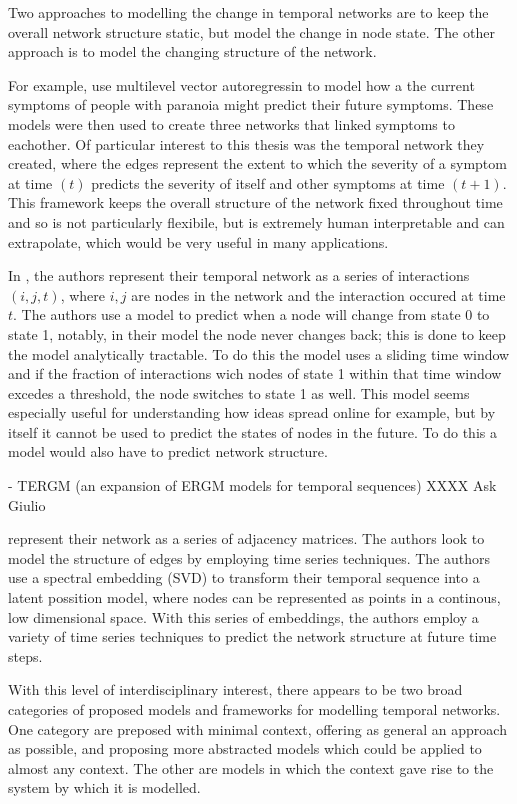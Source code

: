 \documentclass[12pt]{amsart}
\begin{document}
    
    Two approaches to modelling the change in temporal networks are to keep the overall network structure static, but model the change in node state. The other approach is to model the changing structure of the network. 

    For example, \cite{contreras2020temporal} use multilevel vector autoregressin to model how a the current symptoms of people with paranoia might predict their future symptoms. These models were then used to create three networks that linked symptoms to eachother. Of particular interest to this thesis was the temporal network they created, where the edges represent the extent to which the severity of a symptom at time $(t)$ predicts the severity of itself and other symptoms at time $(t+1)$. This framework keeps the overall structure of the network fixed throughout time and so is not particularly flexibile, but is extremely human interpretable and can extrapolate, which would be very useful in many applications. 

    In \cite{KARIMI20133476}, the authors represent their temporal network as a series of interactions $(i,j,t)$, where $i,j$ are nodes in the network and the interaction occured at time $t$. The authors use a model to predict when a node will change from state 0 to state 1, notably, in their model the node never changes back; this is done to keep the model analytically tractable. To do this the model uses a sliding time window and if the fraction of interactions wich nodes of state 1 within that time window excedes a threshold, the node switches to state 1 as well. This model seems especially useful for understanding how ideas spread online for example, but by itself it cannot be used to predict the states of nodes in the future. To do this a model would also have to predict network structure.

    \cite{hanneke2010discrete} - TERGM (an expansion of ERGM models for temporal sequences) XXXX Ask Giulio

    \cite{sanna2021link} represent their network as a series of adjacency matrices. The authors look to model the structure of edges by employing time  series techniques. The authors use a spectral embedding (SVD) to transform their temporal sequence into a latent possition model, where nodes can be represented as points in a continous, low dimensional space. With this series of embeddings, the authors employ a variety of time series techniques to predict the network structure at future time steps.

    
    With this level of interdisciplinary interest, there appears to be two broad categories of proposed models and frameworks for modelling temporal networks. One category are preposed with minimal context, offering as general an approach as possible\cite{HOLME201297,KARIMI20133476}, and proposing more abstracted models which could be applied to almost any context. The other are models in which the context gave rise to the system by which it is modelled\cite{zhangSpatioTempFlow2020,jordan2020current,moinetEffectOfRisk2018,caballero2017real}.
\end{document}
